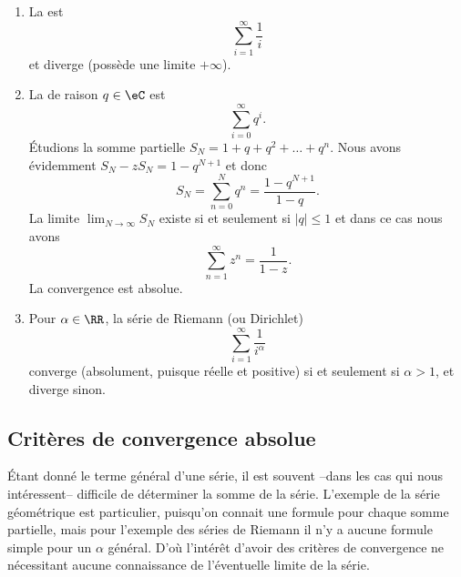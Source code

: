 \begin{example}\label{exemplesseries}
\begin{enumerate}

\item
    La  est
\begin{equation}
\sum_{i=1}^\infty \frac1i
\end{equation}
et diverge (possède une limite $+\infty$).

\item
    La  de raison $q \in \eC$ est
\begin{equation}
\sum_{i=0}^\infty q^i.
\end{equation}
Étudions la somme partielle \( S_N=1+q+q^2+\ldots +q^{n}\). Nous avons évidemment $S_N-zS_N=1-q^{N+1}$ et donc
\begin{equation}
    S_N=\sum_{n=0}^Nq^n=\frac{ 1-q^{N+1} }{ 1-q }.
\end{equation}
La limite \( \lim_{N\to \infty} S_N\) existe si et seulement si \( | q |\leq 1\) et dans ce cas nous avons
\begin{equation}
    \sum_{n=1}^{\infty}z^n=\frac{ 1 }{ 1-z }.
\end{equation}
La convergence est absolue.

\item
Pour $\alpha \in \RR$, la série de Riemann (ou Dirichlet)
\begin{equation}		\label{EqSerRiem}
\sum_{i=1}^\infty \frac1{i^\alpha}
\end{equation}
converge (absolument, puisque réelle et positive) si et seulement
si $\alpha > 1$, et diverge sinon.
\end{enumerate}
\end{example}

\subsection{Critères de convergence absolue}

  Étant donné le terme général d'une série, il est souvent --dans les cas qui nous intéressent-- difficile de déterminer la somme de la série. L'exemple de la série géométrique est particulier, puisqu'on connait une formule pour chaque somme partielle, mais pour l'exemple des séries de Riemann il n'y a aucune formule simple pour un $\alpha$ général. D'où l'intérêt d'avoir des critères de convergence ne nécessitant aucune connaissance de l'éventuelle limite de la série.

